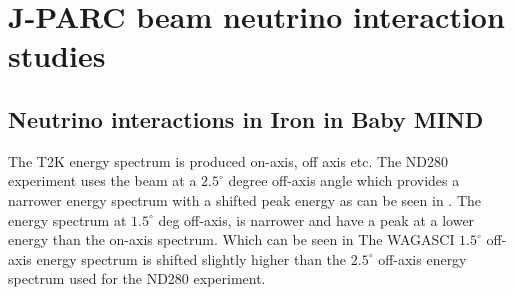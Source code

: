 \chapter{J-PARC beam neutrino interaction studies}
\label{c:neutrinoT2K}







 
\section{Neutrino interactions in Iron in Baby MIND}

The T2K energy spectrum is produced on-axis, off axis etc. The ND280 experiment uses the beam at a $2.5^\circ$ degree off-axis angle which provides a narrower energy spectrum with a shifted peak energy as can be seen in . The energy spectrum at $1.5^\circ$ deg off-axis, is narrower and have a peak at a lower energy than the on-axis spectrum. Which can be seen in  The WAGASCI $1.5^\circ$ off-axis energy spectrum is shifted slightly higher than the $2.5^\circ$ off-axis energy spectrum used for the ND280 experiment.

